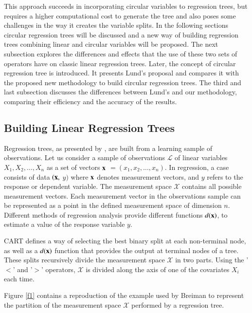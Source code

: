 \documentclass[times,twocolumn,final,authoryear]{elsarticle}
\begin{document}
This approach succeeds in incorporating circular variables to regression trees, but requires a higher computational cost to generate the tree and also poses some challenges in the way it creates the variable splits. In the following sections circular regression trees will be discussed and a new way of building regression trees combining linear and circular variables will be proposed. The next subsection explores the differences and effects that the use of these two sets of operators have on classic linear regression trees. Later, the concept of circular regression tree is introduced. It presents Lund's proposal and compares it with the proposed new methodology to build circular regression trees. The third and last subsection discusses the differences between Lund's and our methodology, comparing their efficiency and the accuracy of the results.

\subsection{Building Linear Regression Trees}

Regression trees, as presented by \citep{Breimanetal1984}, are built from a learning sample of observations. Let us consider a sample of observations $\mathcal{L}$ of linear variables $ X_1, X_2, \dots, X_n $ as a set of vectors $\bf{x} $ $= (x_1, x_2, \dots, x_n)$. In regression, a case consists of data $(\bf{x},$ $y)$ where $\bf{x}$ denotes measurement vectors, and $ y $ refers to the response or dependent variable. The measurement space $\mathcal{X}$ contains all possible measurement vectors. Each measurement vector in the observations sample can be represented as a point in the defined measurement space of dimension $n$. Different methods of regression analysis provide different functions $d(\bf{x})$, to estimate a value of the response variable $y$.

CART defines a way of selecting the best binary split at each non-terminal node, as well as a $d(\bf{x})$ function that provides the output at terminal nodes of a tree. These splits recursively divide the measurement space $\mathcal{X}$ in two parts. Using the '$<$' and '$>$' operators, $\mathcal{X}$ is divided along the axis of one of the covariates $X_i$ each time.

Figure \ref{f1} contains a reproduction of the example used by Breiman to represent the partition of the measurement space $\mathcal{X}$ performed by a regression tree.
\end{document}
